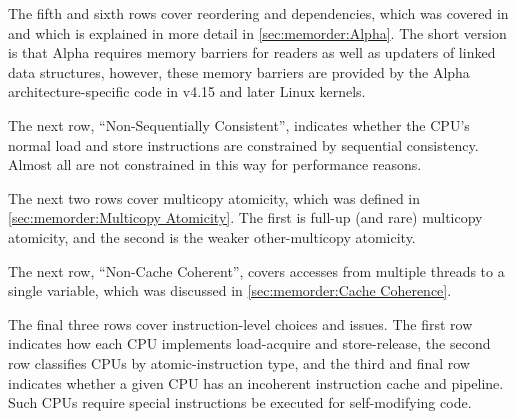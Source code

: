 The fifth and sixth rows cover reordering and dependencies,
which was covered in
and which is explained in more detail in
\cref{sec:memorder:Alpha}.
The short version is that Alpha requires memory barriers for readers
as well as updaters of linked data structures, however, these memory
barriers are provided by the Alpha architecture-specific code in
v4.15 and later Linux kernels.

The next row, ``Non-Sequentially Consistent'', indicates whether
the CPU's normal load and store instructions are constrained by
sequential consistency.
Almost all are not constrained in this way for performance reasons.

The next two rows cover multicopy atomicity, which was defined in
\cref{sec:memorder:Multicopy Atomicity}.
The first is full-up (and rare) multicopy atomicity, and the second is the
weaker other-multicopy atomicity.

The next row, ``Non-Cache Coherent'', covers accesses from multiple
threads to a single variable, which was discussed in
\cref{sec:memorder:Cache Coherence}.

The final three rows cover instruction-level choices and issues.
The first row indicates how each CPU implements load-acquire
and store-release, the second row classifies CPUs by atomic-instruction
type, and the third and final row
indicates whether a given CPU has an incoherent
instruction cache and pipeline.
Such CPUs require special instructions be executed for self-modifying
code.


